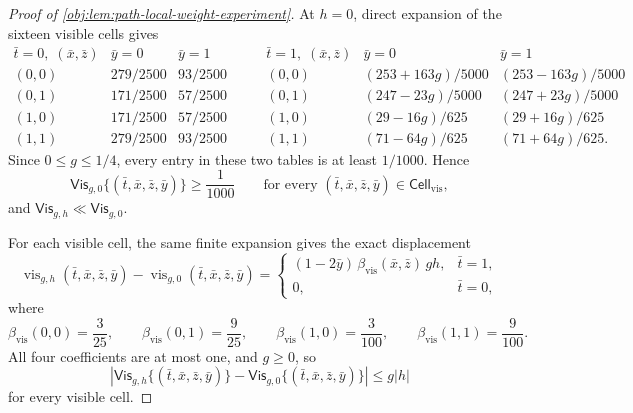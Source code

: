 \documentclass[11pt]{article}
\begin{document}
\begin{proof}[Proof of \cref{obj:lem:path-local-weight-experiment}]
At \(h=0\), direct expansion of the sixteen visible cells gives
\[
\begin{array}{c|cc}
\bar t=0,\;(\bar x,\bar z) & \bar y=0 & \bar y=1\\ \hline
(0,0) & 279/2500 & 93/2500\\
(0,1) & 171/2500 & 57/2500\\
(1,0) & 171/2500 & 57/2500\\
(1,1) & 279/2500 & 93/2500
\end{array}
\qquad
\begin{array}{c|cc}
\bar t=1,\;(\bar x,\bar z) & \bar y=0 & \bar y=1\\ \hline
(0,0) & (253+163g)/5000 & (253-163g)/5000\\
(0,1) & (247-23g)/5000 & (247+23g)/5000\\
(1,0) & (29-16g)/625 & (29+16g)/625\\
(1,1) & (71-64g)/625 & (71+64g)/625 .
\end{array}
\]
Since \(0\le g\le 1/4\), every entry in these two tables is at least \(1/1000\).  Hence
\[
\mathsf{Vis}_{g,0}\{(\bar t,\bar x,\bar z,\bar y)\}\ge \frac1{1000}
\qquad
\text{for every }(\bar t,\bar x,\bar z,\bar y)\in\mathsf{Cell}_{\mathrm{vis}},
\]
and \(\mathsf{Vis}_{g,h}\ll\mathsf{Vis}_{g,0}\). %

For each visible cell, the same finite expansion gives the exact displacement
\[
\operatorname{vis}_{g,h}(\bar t,\bar x,\bar z,\bar y)
-
\operatorname{vis}_{g,0}(\bar t,\bar x,\bar z,\bar y)
=
\begin{cases}
(1-2\bar y)\,\beta_{\mathrm{vis}}(\bar x,\bar z)\,g h,
& \bar t=1,\\
0,& \bar t=0,
\end{cases}
\]
where
\[
\beta_{\mathrm{vis}}(0,0)=\frac3{25},\qquad
\beta_{\mathrm{vis}}(0,1)=\frac9{25},\qquad
\beta_{\mathrm{vis}}(1,0)=\frac3{100},\qquad
\beta_{\mathrm{vis}}(1,1)=\frac9{100}.
\]
All four coefficients are at most one, and \(g\ge0\), so
\[
\left|
\mathsf{Vis}_{g,h}\{(\bar t,\bar x,\bar z,\bar y)\}
-
\mathsf{Vis}_{g,0}\{(\bar t,\bar x,\bar z,\bar y)\}
\right|
\le g|h|
\]
for every visible cell. %


\end{proof}
\end{document}
